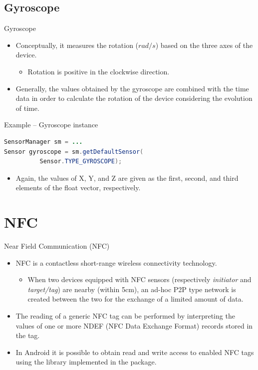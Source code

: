 \documentclass{beamer}
\begin{document}
\subsection{Gyroscope}

  \begin{frame}[fragile]{Gyroscope}
    \begin{itemize}\itemsep10pt
      \item Conceptually, it measures the rotation ($rad / s$) based on the three axes of the device.
      \begin{itemize}
        \item Rotation is positive in the clockwise direction.
      \end{itemize}
      \item Generally, the values obtained by the gyroscope are combined with
      the time data in order to calculate the rotation of the device considering
      the evolution of time.
    \end{itemize}

    \begin{exampleblock}{Example -- Gyroscope instance}
      \begin{lstlisting}[language=Java]  
SensorManager sm = ...
Sensor gyroscope = sm.getDefaultSensor(
          Sensor.TYPE_GYROSCOPE);
      \end{lstlisting}
    \end{exampleblock}
    \begin{itemize}
      \item Again, the values of X, Y, and Z are given as the first, second, and
      third elements of the float vector, respectively.
    \end{itemize}
  \end{frame}

\section{NFC}

  \begin{frame}{Near Field Communication (NFC)}
    \begin{itemize}\itemsep10pt
      \item NFC is a contactless short-range wireless connectivity technology.
      \begin{itemize}
        \item When two devices equipped with NFC sensors (respectively \textit{initiator}
        and \textit{target/tag}) are nearby (within 5cm), an ad-hoc P2P type network is
        created between the two for the exchange of a limited amount of data.
      \end{itemize}
      \item The reading of a generic NFC tag can be performed by interpreting
      the values of one or more NDEF (NFC Data Exchange Format) records stored
      in the tag.
      \item In Android it is possible to obtain read and write access to enabled
      NFC tags using the library implemented in the  package.
    \end{itemize}
  \end{frame}
\end{document}
